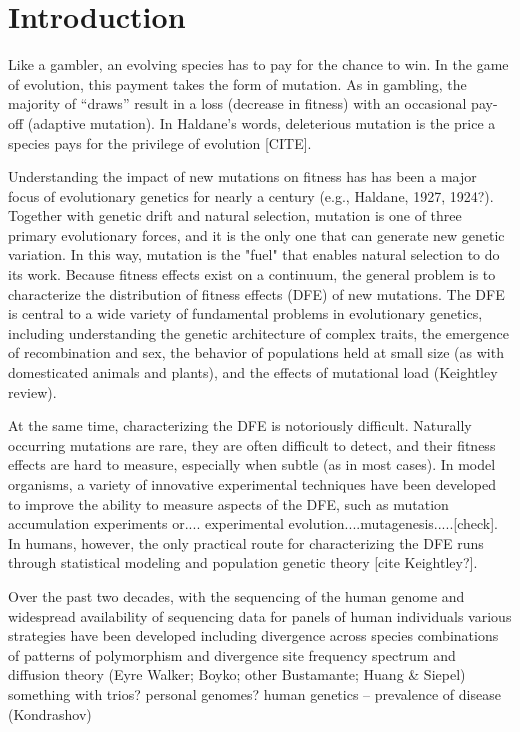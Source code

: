 \documentclass[11pt]{article}
\begin{document}
\section*{Introduction}

Like a gambler, an evolving species has to pay for the chance to win.   In the game of evolution, this payment takes the form of mutation.  As in gambling, the majority of ``draws'' result in a loss (decrease in fitness) with an occasional pay-off (adaptive mutation).  In Haldane's words, deleterious mutation is the price a species pays for the privilege of evolution [CITE].

Understanding the impact of new mutations on fitness has has been a major focus of evolutionary genetics for nearly a century (e.g., Haldane, 1927, 1924?). Together with genetic drift and natural selection, mutation is one of  three primary evolutionary forces, and it is the only one that can generate new genetic variation.  In this way, mutation is the "fuel" that enables natural selection to do its work.  Because fitness effects exist on a continuum, the general problem is to characterize the distribution of fitness effects (DFE) of new mutations.  The DFE is central to a wide variety of fundamental problems in evolutionary genetics, including understanding the genetic architecture of complex traits, the emergence of recombination and sex, the behavior of populations held at small size (as with domesticated animals and plants), and the effects of mutational load (Keightley review).


At the same time, characterizing the DFE is notoriously difficult.  Naturally occurring mutations are rare, they are often difficult to detect, and their fitness effects are hard to measure, especially when subtle (as in most cases).  In model organisms, a variety of innovative experimental techniques have been developed to improve the ability to measure aspects of the DFE, such as mutation accumulation experiments or....
experimental evolution....mutagenesis.....[check].  In humans, however, the only practical route for characterizing the DFE runs through statistical modeling and population genetic theory [cite Keightley?].

Over the past two decades, with the sequencing of the human genome and widespread availability of sequencing data for panels of human individuals
various strategies have been developed
including 
divergence across species
combinations of patterns of polymorphism and divergence
site frequency spectrum and diffusion theory (Eyre Walker; Boyko; other Bustamante; Huang \& Siepel)
something with trios?  personal genomes?
human genetics -- prevalence of disease (Kondrashov)
\end{document}
